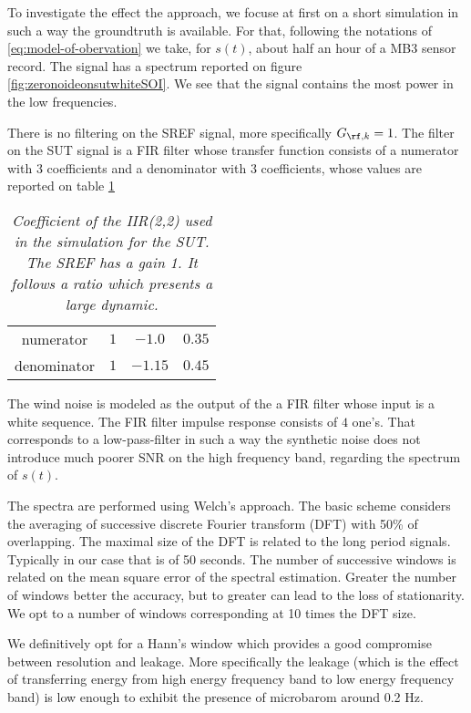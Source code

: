 
To investigate the effect the approach, we focuse at first on a short simulation in such a way the groundtruth is available. For that, following the notations of \eqref{eq:model-of-obervation} we take, for $s(t)$, about half an hour of a MB3 sensor record. The signal has a spectrum reported on figure \ref{fig:zeronoideonsutwhiteSOI}. We see that the signal contains the most power in the low frequencies.

There is no filtering on the SREF signal, more specifically $G_{\rf,k}=1$.  The filter on the SUT signal is a FIR filter whose transfer function consists of a numerator with 3 coefficients and a denominator with 3 coefficients, whose values are reported on table \ref{tab:UT-sensor}
\begin{table}[h]
\begin{center}
\begin{tabular}{|c| c c c||}
\hline
numerator  & $1$ &$-1.0$ &$0.35$
\\
denominator  &$1$ &$-1.15$& $0.45$  
\\
\hline
\end{tabular}
\parbox{12 cm}
{
    \caption{\protect\small\it  Coefficient of the IIR(2,2) used in the simulation for the SUT. The SREF  has a gain 1. It follows a ratio which presents a large dynamic. }
    \label {tab:UT-sensor}
}
\end{center}
\end{table}


The wind noise is modeled as the output of the a FIR filter whose input is a white sequence. The FIR filter impulse response consists of $4$ one's. That corresponds to a low-pass-filter in such a way the synthetic noise does not introduce much poorer SNR on the high frequency band, regarding the spectrum of $s(t)$.

The spectra are performed using Welch's approach. The basic scheme considers the averaging of successive discrete Fourier transform (DFT) with 50\% of overlapping. The maximal size of the DFT is related to the long period signals. Typically in our case that is of 50 seconds. The number of successive windows is related on the mean square error of the spectral estimation. Greater the number of windows better the accuracy, but to greater can lead to the loss of stationarity. We opt to a number of windows corresponding at 10 times the DFT size.

We definitively opt for a Hann's window which provides a good compromise between resolution and leakage. More specifically the leakage (which is the effect of transferring energy from high energy frequency band to low energy frequency band) is low enough to exhibit the presence of microbarom around 0.2 Hz. 

